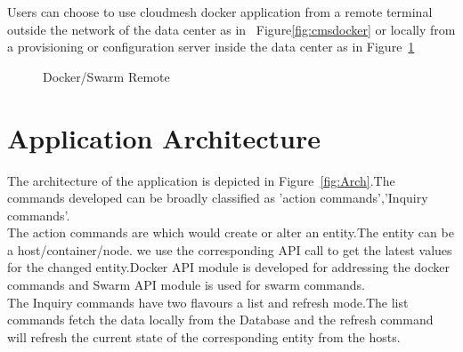 \documentclass[9pt,twocolumn,twoside]{../../styles/osajnl}
\begin{document}
Users can choose to use cloudmesh docker application from a remote terminal outside the network of the data center as in ~Figure\ref{fig:cmsdocker} or locally from a provisioning or configuration server inside the data center as in Figure~\ref{fig:cmsdocker-2}
\begin{figure}[h!]
\centering
{}
\caption{Docker/Swarm Remote }
\label{fig:cmsdocker-2}
\end{figure}



\section{Application Architecture}
The architecture of the application is depicted in Figure~\ref{fig:Arch}.The commands developed can be broadly classified as 'action commands','Inquiry commands'.\\
The action commands are which would create or alter an entity.The entity can be a host/container/node. we use the corresponding API call to get the latest values for the changed entity.Docker API module is developed for addressing the docker commands and Swarm API module is used for swarm commands.\\
The Inquiry commands have two flavours a list and refresh mode.The list commands fetch the data locally from the Database and the refresh command will refresh the current state of the corresponding entity from the hosts.
\end{document}
